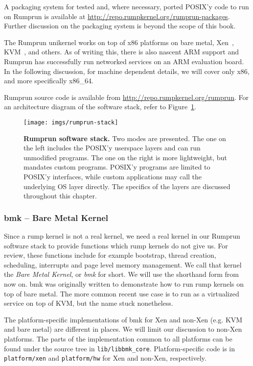 A packaging system for tested and, where necessary, ported
POSIX'y code to run on Rumprun is available at
\url{http://repo.rumpkernel.org/rumprun-packages}.  Further discussion on
the packaging system is beyond the scope of this book.

The Rumprun unikernel works on top of x86 platforms on bare metal,
Xen~\cite{barham:xen}, KVM~\cite{kivity:kvm}, and others.  As of writing
this, there is also nascent ARM support and Rumprun has successfully
run networked services on an ARM evaluation board.  In the following
discussion, for machine dependent details, we will cover only x86,
and more specifically x86\_64.

Rumprun source code is available from
\url{http://repo.rumpkernel.org/rumprun}.  For an architecture diagram
of the software stack, refer to Figure~\ref{fig:rumprun-stack}.

\begin{figure}[t]
\texttt{[image: imgs/rumprun-stack]}
\caption[Rumprun software stack]{\textbf{Rumprun software stack.}
Two modes are presented.  The one on the left includes the POSIX'y
userspace layers and can run unmodified programs.  The one on the
right is more lightweight, but mandates custom programs.  POSIX'y
programs are limited to POSIX'y interfaces, while custom applications
may call the underlying OS layer directly.  The specifics of
the layers are discussed throughout this chapter.
}
\label{fig:rumprun-stack}
\end{figure}

\subsubsection{bmk -- Bare Metal Kernel}

Since a rump kernel is not a real kernel, we need a real kernel in our
Rumprun software stack to provide functions which rump kernels do not give us.
For review, these functions include for example bootstrap, thread
creation, scheduling, interrupts and page level memory management.  We call
that kernel the \textit{Bare Metal Kernel}, or \textit{bmk} for short.
We will use the shorthand form from now on.  bmk was
originally written to demonstrate how to run rump kernels on
top of bare metal.  The more common recent use case is to run as a
virtualized service on top of \eg KVM, but the name stuck nonetheless.

The platform-specific implementations of bmk for Xen and non-Xen (e.g.
KVM and bare metal) are different in places.  We will limit our
discussion to non-Xen platforms.  The parts of the implementation
common to all platforms can be found under the source tree in
\verb+lib/libbmk_core+.  Platform-specific code is in
\texttt{platform/xen} and \texttt{platform/hw} for Xen and non-Xen,
respectively.



